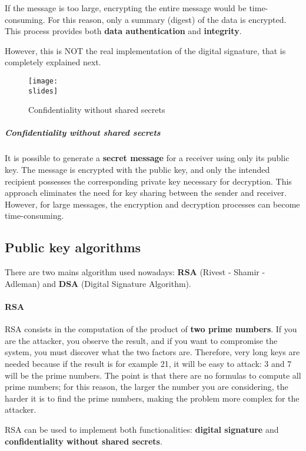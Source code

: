 If the message is too large, encrypting the entire message would be time-consuming. For this reason, only a summary (digest) of the data is encrypted. This process provides both \textbf{data authentication} and \textbf{integrity}.

However, this is NOT the real implementation of the digital signature, that is completely explained next. %

\begin{figure}[h]
    \centering
    \texttt{[image: \\slides]}
    \caption{Confidentiality without shared secrets}
\end{figure}

\subparagraph{Confidentiality without shared secrets}
It is possible to generate a \textbf{secret message} for a receiver using only its public key.
The message is encrypted with the public key, and only the intended recipient possesses the corresponding private key necessary for decryption.
This approach eliminates the need for key sharing between the sender and receiver.
However, for large messages, the encryption and decryption processes can become time-consuming.

\subsection{Public key algorithms}
There are two mains algorithm used nowadays: \textbf{RSA} (Rivest - Shamir - Adleman) and \textbf{DSA} (Digital Signature
Algorithm).

\paragraph{RSA}
RSA consists in the computation of the product of \textbf{two prime numbers}. If you are the attacker, you observe the
result, and if you want to compromise the system, you must discover what the two factors are. Therefore, very long
keys are needed because if the result is for example 21, it will be easy to attack: 3 and 7 will be the prime numbers. The point is that there are no formulas to compute all prime numbers; for this reason, the larger the number you
are considering, the harder it is to find the prime numbers, making the problem more complex for the attacker.

RSA can be used to implement both functionalities: \textbf{digital signature} and \textbf{confidentiality without shared secrets}.

